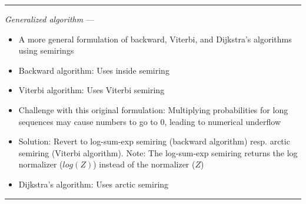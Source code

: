 {\color{lightgray}\hrule height 0.001mm}

\emph{Generalized algorithm} --- 
\begin{itemize}
    \item A more general formulation of backward, Viterbi, and Dijkstra's algorithms using semirings
    \item Backward algorithm: Uses inside semiring
    \item Viterbi algorithm: Uses Viterbi semiring
    \item Challenge with this original formulation: Multiplying probabilities for long sequences may cause numbers to go to $0$, leading to numerical underflow
    \item Solution: Revert to log-sum-exp semiring (backward algorithm) resp. arctic semiring (Viterbi algorithm). Note: The log-sum-exp semiring returns the log normalizer ($log(Z)$) instead of the normalizer ($Z$)
    \item Dijkstra's algorithm: Uses arctic semiring
\end{itemize}

{\color{lightgray}\hrule height 0.001mm}

